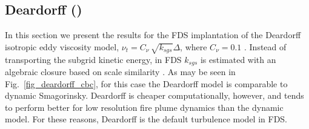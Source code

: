 \documentclass[11pt]{book}
\begin{document}
\subsection{Deardorff (\texorpdfstring{}{deardorff})}
\label{Deardorff_model}

In this section we present the results for the FDS implantation of the Deardorff isotropic eddy viscosity model, $\nu_t = C_\nu \,\sqrt{k_{sgs}} \Delta$, where $C_\nu = 0.1$ \cite{Pope:2000,Deardorff:1980}.  Instead of transporting the subgrid kinetic energy, in FDS $k_{sgs}$ is estimated with an algebraic closure based on scale similarity \cite{Bardina:1980}.  As may be seen in Fig.~\ref{fig_deardorff_cbc}, for this case the Deardorff model is comparable to dynamic Smagorinsky.  Deardorff is cheaper computationally, however, and tends to perform better for low resolution fire plume dynamics than the dynamic model. For these reasons, Deardorff is the default turbulence model in FDS.
\end{document}
